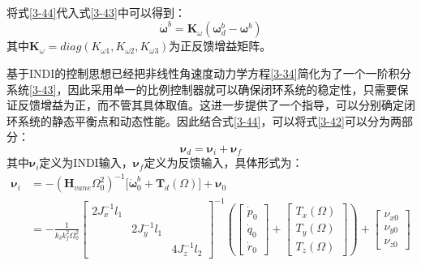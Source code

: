 将式\eqref{3-44}代入式\eqref{3-43}中可以得到：
\begin{equation}
    \dot{\boldsymbol \omega}^b=\boldsymbol{K}_{\omega}(\boldsymbol{\omega}_d^b-\boldsymbol{\omega}^b)
    \label{3-45}
\end{equation}
其中$\boldsymbol{K}_\omega=diag({K}_{\omega 1},{K}_{\omega 2},{K}_{\omega 3})$为正反馈增益矩阵。

基于INDI的控制思想已经把非线性角速度动力学方程\eqref{3-34}简化为了一个一阶积分系统\eqref{3-43}，因此采用单一的比例控制器就可以确保闭环系统的稳定性，只需要保证反馈增益为正，而不管其具体取值。这进一步提供了一个指导，可以分别确定闭环系统的静态平衡点和动态性能。因此结合式\eqref{3-44}，可以将式\eqref{3-42}可以分为两部分：
\begin{equation}
    \boldsymbol{\nu}_d=\boldsymbol{\nu}_i + \boldsymbol{\nu}_f
    \label{3-46}
\end{equation}
其中$\boldsymbol{\nu}_i$定义为INDI输入，$\boldsymbol{\nu}_f$定义为反馈输入，具体形式为：
\begin{equation}
    \begin{aligned}
        \boldsymbol{\nu}_i&=-(\boldsymbol{H}_{vane}\Omega_0^2)^{-1} \big[\boldsymbol{\dot{\omega}}_0^b+\boldsymbol{T}_d(\Omega)\big]+\boldsymbol{\nu}_0\\
        &=-\frac{1}{k_{\delta}k_f^2\Omega_0^2}
        \left[\begin{array}{ccc}2J_x^{-1}l_1 & & \\& 2J_y^{-1}l_1 & \\& & 4J_z^{-1}l_2\end{array}\right]^{-1}
        \left (\begin{bmatrix}\dot{p}_0 \\ \dot{q}_0 \\ \dot{r}_0 \end{bmatrix}+\begin{bmatrix}T_{x}(\Omega) \\ T_{y}(\Omega) \\ T_{z}(\Omega)
        \end{bmatrix}\right )
        +  \begin{bmatrix}\nu_{x0} \\ \nu_{y0} \\ \nu_{z0}\end{bmatrix}
    \end{aligned}
    \label{3-47}
\end{equation}
